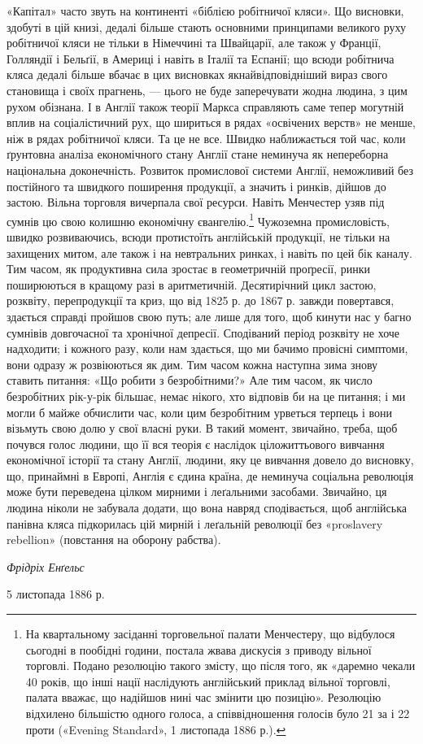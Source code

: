 «Капітал» часто звуть на континенті «біблією робітничої
кляси». Що висновки, здобуті в цій книзі, дедалі більше стають
основними принципами великого руху робітничої кляси не тільки
в Німеччині та Швайцарії, але також у Франції, Голляндії і
Бельґії, в Америці і навіть в Італії та Еспанії; що всюди робітнича
кляса дедалі більше вбачає в цих висновках якнайвідповідніший
вираз свого становища і своїх прагнень, — цього не буде
заперечувати жодна людина, з цим рухом обізнана. І в Англії також
теорії Маркса справляють саме тепер могутній вплив на соціалістичний
рух, що шириться в рядах «освічених верств» не менше,
ніж в рядах робітничої кляси. Та це не все. Швидко наближається
той час, коли ґрунтовна аналіза економічного стану Англії стане
неминуча як непереборна національна доконечність. Розвиток
промислової системи Англії, неможливий без постійного та швидкого
поширення продукції, а значить і ринків, дійшов до застою.
Вільна торговля вичерпала свої ресурси. Навіть Менчестер узяв
під сумнів цю свою колишню економічну євангелію.\footnote{
На квартальному засіданні торговельної палати Менчестеру, що
відбулося сьогодні в пообідні години, постала жвава дискусія з приводу
вільної торговлі. Подано резолюцію такого змісту, що після того, як
«даремно чекали 40 років, що інші нації наслідують англійський приклад
вільної торговлі, палата вважає, що надійшов нині час змінити цю позицію».
Резолюцію відхилено більшістю одного голоса, а співвідношення
голосів було 21 за і 22 проти («Evening Standard», 1 листопада 1886 р.).
} Чужоземна
промисловість, швидко розвиваючись, всюди протистоїть англійській
продукції, не тільки на захищених митом, але також і на
невтральних ринках, і навіть по цей бік каналу. Тим часом, як
продуктивна сила зростає в геометричній проґресії, ринки поширюються
в кращому разі в аритметичній. Десятирічний цикл
застою, розквіту, перепродукції та криз, що від 1825 р. до 1867 р.
завжди повертався, здається справді пройшов свою путь; але
лише для того, щоб кинути нас у багно сумнівів довгочасної та
хронічної депресії. Сподіваний період розквіту не хоче надходити;
і кожного разу, коли нам здається, що ми бачимо провісні
симптоми, вони одразу ж розвіюються як дим. Тим часом  кожна
наступна зима знову ставить питання: «Що робити з безробітними?»
Але тим часом, як число безробітних рік-у-рік більшає,
немає нікого, хто відповів би на це питання; і ми могли б майже
обчислити час, коли цим безробітним урветься терпець і вони
візьмуть свою долю у свої власні руки. В такий момент, звичайно,
треба, щоб почувся голос людини, що її вся теорія є наслідок
ціложиттьового вивчання економічної історії та стану Англії,
людини, яку це вивчання довело до висновку, що, принаймні в
Европі, Англія є єдина країна, де неминуча соціальна революція
може бути переведена цілком мирними і леґальними засобами.
Звичайно, ця людина ніколи не забувала додати, що вона навряд
сподівається, щоб англійська панівна кляса підкорилась цій
мирній і леґальній революції без «proslavery rebellion» (повстання
на оборону рабства).

\begin{flushright}
\emph{Фрідріх Енґельс}
\end{flushright}

5 листопада 1886 р.
